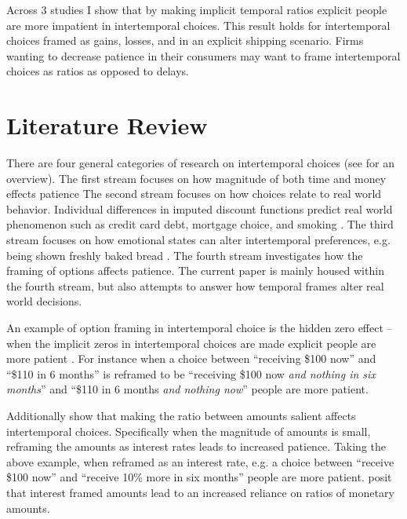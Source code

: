 \documentclass[]{article}
\begin{document}

Across 3 studies I show that by making implicit temporal ratios explicit people are more impatient in intertemporal choices. 
This result holds for intertemporal choices framed as gains, losses, and in an explicit shipping scenario. 
Firms wanting to decrease patience in their consumers may want to frame intertemporal choices as ratios as opposed to delays.
 

\section{Literature Review}


There are four general categories of research on  intertemporal choices (see  for an overview).
The first stream focuses on how magnitude of both time and money effects patience \cite{Scholten2006, Thaler1981}
The second stream focuses on how choices relate to real world behavior.
Individual differences in imputed discount functions predict real world phenomenon such as credit card debt,  mortgage choice, and smoking \cite{MacKillop2011, Meier2009, Johnson2011}. 
The third stream focuses on how emotional states can alter intertemporal preferences, e.g. being shown freshly baked bread \cite{Li2008}. 
The fourth stream investigates how the framing of options affects patience. 
The current paper is mainly housed within the fourth stream, but also attempts to answer how temporal frames alter real world decisions. 

An example of option framing in intertemporal choice is the hidden zero effect -- when the implicit zeros in intertemporal choices are made explicit people are more patient \cite{Magen2008}. 
For instance when a choice between ``receiving \$100 now'' and ``\$110 in 6 months'' is reframed to be  ``receiving \$100 now \textit{and nothing in six months}'' and ``\$110 in 6 months \textit{and nothing now}'' people are more patient. 

Additionally  show that making the ratio between amounts salient affects intertemporal choices. 
Specifically when the magnitude of amounts is small, reframing the amounts as interest rates leads to increased patience. Taking the above example, when reframed as an interest rate, e.g.  a choice between  ``receive \$100 now'' and ``receive 10\% more in six months'' people are more patient. 
 posit that interest framed amounts lead to an increased reliance on ratios of monetary amounts.
\end{document}
